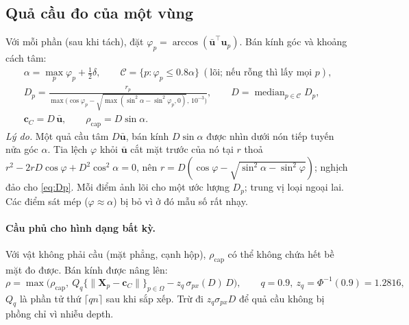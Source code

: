 \documentclass[11pt,a4paper]{article}
\numberwithin{equation}{section}
\newcommand{\vb}[1]{\bm{#1}}
\newcommand{\T}{^{\!\top}}
\theoremstyle{definition}
\theoremstyle{plain}
\theoremstyle{remark}
\begin{document}
\subsection{Quả cầu đo của một vùng}
\label{sec:sphere}
Với mỗi phần (sau khi tách), đặt $\varphi_p=\arccos(\bar{\vb u}\T\vb u_p)$. Bán kính góc và khoảng cách tâm:
\begin{gather}
\alpha=\max_{p}\varphi_p+\tfrac12\delta,\qquad
\mathcal C=\{p:\varphi_p\le0.8\alpha\}\ (\text{lõi; nếu rỗng thì lấy mọi }p), \label{eq:alpha}\\
D_p=\frac{r_p}{\max\!\big(\cos\varphi_p-\sqrt{\max(\sin^2\alpha-\sin^2\varphi_p,0)},\,10^{-3}\big)},\qquad
D=\operatorname{median}_{p\in\mathcal C}D_p, \label{eq:Dp}\\
\vb c_C=D\,\bar{\vb u},\qquad \rho_{\text{cap}}=D\sin\alpha. \label{eq:sphere}
\end{gather}
\emph{Lý do.} Một quả cầu tâm $D\bar{\vb u}$, bán kính $D\sin\alpha$ được nhìn dưới nón tiếp tuyến nửa góc $\alpha$. Tia lệch $\varphi$ khỏi $\bar{\vb u}$ cắt mặt trước của nó tại $r$ thoả $r^2-2rD\cos\varphi+D^2\cos^2\alpha=0$, nên $r=D(\cos\varphi-\sqrt{\sin^2\alpha-\sin^2\varphi})$; nghịch đảo cho \eqref{eq:Dp}. Mỗi điểm ảnh lõi cho một ước lượng $D_p$; trung vị loại ngoại lai. Các điểm sát mép ($\varphi\approx\alpha$) bị bỏ vì ở đó mẫu số rất nhạy.

\paragraph{Cầu phủ cho hình dạng bất kỳ.} Với vật không phải cầu (mặt phẳng, cạnh hộp), $\rho_{\text{cap}}$ có thể không chứa hết bề mặt đo được. Bán kính được nâng lên:
\begin{equation}
\rho=\max\!\Big(\rho_{\text{cap}},\ Q_{q}\big\{\|\vb X_p-\vb c_C\|\big\}_{p\in\Omega}-z_q\,\sigma_{px}(D)\,D\Big),\qquad q=0.9,\ z_q=\Phi^{-1}(0.9)=1.2816, \label{eq:cover}
\end{equation}
$Q_q$ là phần tử thứ $\lceil qn\rceil$ sau khi sắp xếp. Trừ đi $z_q\sigma_{px}D$ để quả cầu không bị phồng chỉ vì nhiễu depth.
\end{document}
